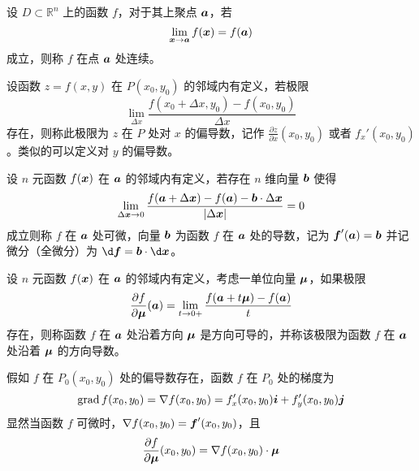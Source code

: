 \begin{definition}[多元函数的连续性]
	设 $D \subset \mathbb{R}^n$ 上的函数 $f$，对于其上聚点 $\boldsymbol{a}$，若
	\[ \lim_{\boldsymbol{x} \to \boldsymbol{a}} f(\boldsymbol{x}) = f(\boldsymbol{a}) \]
	成立，则称 $f$ 在点 $\boldsymbol{a}$ 处连续。
\end{definition}

\begin{definition}[二元函数的偏导数]
	设函数 $z = f(x, y)$ 在 $P(x_0, y_0)$ 的邻域内有定义，若极限
	\[ \lim_{\Delta x} \frac{f(x_0 + \Delta x, y_0) - f(x_0, y_0)}{\Delta x} \]
	存在，则称此极限为 $z$ 在 $P$ 处对 $x$ 的偏导数，记作 $\frac{\partial z}{\partial x}(x_0, y_0)$ 或者 $f_x'(x_0, y_0)$。类似的可以定义对 $y$ 的偏导数。
\end{definition}

\begin{definition}[全微分]
	设 $n$ 元函数 $f(\boldsymbol{x})$ 在 $\boldsymbol{a}$ 的邻域内有定义，若存在 $n$ 维向量 $\boldsymbol{b}$ 使得
	\[ \lim_{\Delta \boldsymbol{x} \to 0} \frac{f(\boldsymbol{a} + \Delta \boldsymbol{x}) - f(\boldsymbol{a}) - \boldsymbol{b} \cdot \Delta \boldsymbol{x}}{|\Delta \boldsymbol{x}|} = 0 \]
	成立则称 $f$ 在 $\boldsymbol{a}$ 处可微，向量 $\boldsymbol{b}$ 为函数 $f$ 在 $\boldsymbol{a}$ 处的导数，记为 $\boldsymbol{f}'(\boldsymbol{a}) = \boldsymbol{b}$ 并记微分（全微分）为 $\d \vbf{f} = \vbf{b} \cdot \d \vbf{x}$。
\end{definition}

\begin{definition}[方向导数]
	设 $n$ 元函数 $f(\boldsymbol{x})$ 在 $\boldsymbol{a}$ 的邻域内有定义，考虑一单位向量 $\boldsymbol{\mu}$，如果极限
	\[ \frac{\partial f}{\partial \boldsymbol{\mu}}(\boldsymbol{a}) = \lim_{t \to 0+} \frac{f(\boldsymbol{a} + t \boldsymbol{\mu}) - f(\boldsymbol{a})}{t} \]
	存在，则称函数 $f$ 在 $\boldsymbol{a}$ 处沿着方向 $\boldsymbol{\mu}$ 是方向可导的，并称该极限为函数 $f$ 在 $\boldsymbol{a}$ 处沿着 $\boldsymbol{\mu}$ 的方向导数。
\end{definition}

假如 $f$ 在 $P_0(x_0, y_0)$ 处的偏导数存在，函数 $f$ 在 $P_0$ 处的梯度为
\[ \operatorname{grad} f (x_0, y_0) = \nabla f(x_0, y_0) = f_x'(x_0, y_0) \boldsymbol{i} + f_y'(x_0, y_0) \boldsymbol{j} \]
显然当函数 $f$ 可微时，$\nabla f(x_0, y_0) = \boldsymbol{f}'(x_0, y_0)$，且
\[ \frac{\partial f}{\partial \boldsymbol{\mu}} (x_0, y_0) = \nabla f(x_0, y_0) \cdot \boldsymbol{\mu} \]

